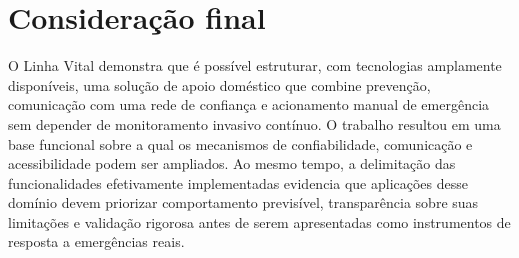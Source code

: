 \section{Consideração final}

O Linha Vital demonstra que é possível estruturar, com tecnologias amplamente disponíveis, uma solução de apoio doméstico que combine prevenção, comunicação com uma rede de confiança e acionamento manual de emergência sem depender de monitoramento invasivo contínuo. O trabalho resultou em uma base funcional sobre a qual os mecanismos de confiabilidade, comunicação e acessibilidade podem ser ampliados. Ao mesmo tempo, a delimitação das funcionalidades efetivamente implementadas evidencia que aplicações desse domínio devem priorizar comportamento previsível, transparência sobre suas limitações e validação rigorosa antes de serem apresentadas como instrumentos de resposta a emergências reais.
